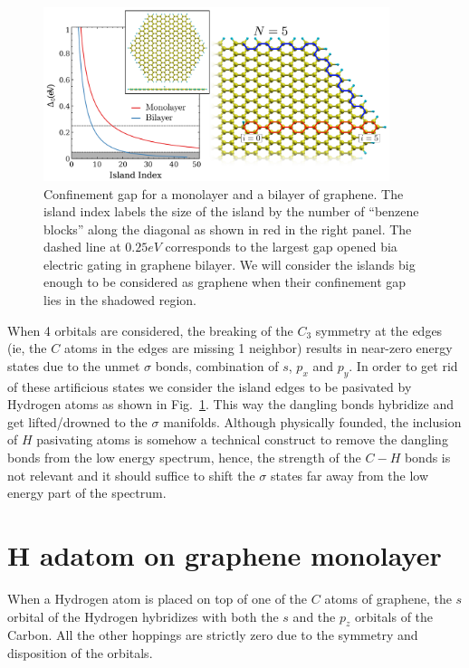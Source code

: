 \begin{figure}[h!]
  \centering
  \includegraphics[width=0.9\textwidth]{defects/fig/cell.pdf}
  \vspace{-5pt}
\caption{Confinement gap for a monolayer and a bilayer of graphene. The island index labels the size of the island by the number of ``benzene blocks'' along the diagonal as shown in red in the right panel. The dashed line at $0.25eV$ corresponds to the largest gap opened bia electric gating in graphene bilayer\cite{Zhang2009}. We will consider the islands big enough to be considered as graphene when their confinement gap lies in the shadowed region.}
\label{confinement}
\end{figure}

When 4 orbitals are considered, the breaking of the $C_3$ symmetry at the edges (ie, the $C$ atoms in the edges are missing 1 neighbor) results in near-zero energy states due to the unmet $\sigma$ bonds, combination of $s$, $p_x$ and $p_y$. In order to get rid of these artificious states we consider the island edges to be pasivated by Hydrogen atoms as shown in Fig.~\ref{confinement}. This way the dangling bonds hybridize and get lifted/drowned to the $\sigma$ manifolds.
Although physically founded, the inclusion of $H$ pasivating atoms is somehow a technical construct to remove the dangling bonds from the low energy spectrum, hence, the strength of the $C-H$ bonds is not relevant and it should suffice to shift the $\sigma$ states far away from the low energy part of the spectrum.

\section{H adatom on graphene monolayer}
When a Hydrogen atom is placed on top of one of the $C$ atoms of graphene, the $s$ orbital of the Hydrogen hybridizes with both the $s$ and the $p_z$ orbitals of the Carbon. All the other hoppings are strictly zero due to the symmetry and disposition of the orbitals.

